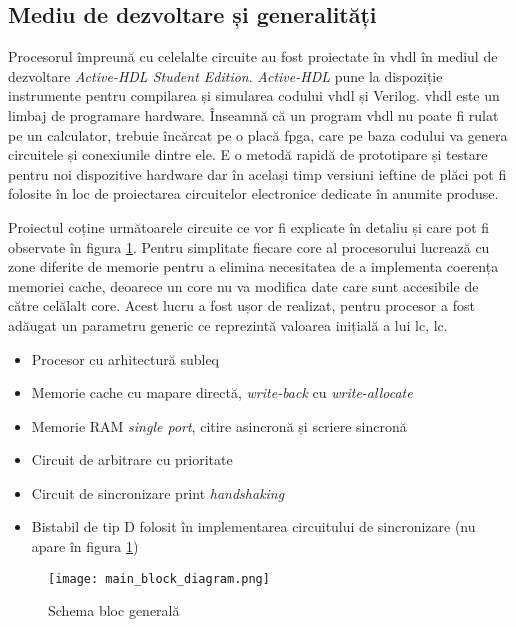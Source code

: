 \documentclass[../main.tex]{subfiles}
\begin{document}
\subsection{Mediu de dezvoltare și generalități}
Procesorul împreună cu celelalte circuite au fost proiectate în \acrshort{vhdl} în mediul de dezvoltare
\emph{Active-HDL Student Edition}. \emph{Active-HDL} pune la dispoziție instrumente pentru compilarea și
simularea codului \acrshort{vhdl} și Verilog. \acrshort{vhdl} este un limbaj de programare hardware. Înseamnă
că un program \acrshort{vhdl} nu poate fi rulat pe un calculator, trebuie încărcat pe o placă \acrshort{fpga},
care pe baza codului va genera circuitele și conexiunile dintre ele. E o metodă rapidă de prototipare și testare
pentru noi dispozitive hardware dar în același timp versiuni ieftine de plăci pot fi folosite în loc de
proiectarea circuitelor electronice dedicate în anumite produse.

Proiectul coține următoarele circuite ce vor fi explicate în detaliu și care pot fi observate în figura 
\ref{fig:main_block_diagram}. Pentru simplitate fiecare core al procesorului lucrează cu zone diferite
de memorie pentru a elimina necesitatea de a implementa coerența memoriei cache, deoarece un core nu va
modifica date care sunt accesibile de către celălalt core. Acest lucru a fost ușor de realizat, pentru
procesor a fost adăugat un parametru generic ce reprezintă valoarea inițială a lui \acrshort{lc}, \acrlong{lc}.
\begin{itemize}
    \item Procesor cu arhitectură \acrshort{subleq}
    \item Memorie cache cu mapare directă, \emph{write-back} cu \emph{write-allocate}
    \item Memorie RAM \emph{single port}, citire asincronă și scriere sincronă
    \item Circuit de arbitrare cu prioritate
    \item Circuit de sincronizare print \emph{handshaking}
    \item Bistabil de tip D folosit în implementarea circuitului de sincronizare (nu apare în figura \ref{fig:main_block_diagram})
\end{itemize}

\begin{figure}[h]
    \centering
    \texttt{[image: main\_block\_diagram.png]}
    \caption{Schema bloc generală}
    \label{fig:main_block_diagram}
\end{figure}
\end{document}
